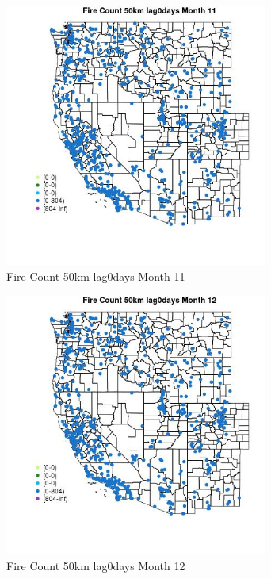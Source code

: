 \begin{figure} 
\centering  
\includegraphics[width=0.77\textwidth]{Code_Outputs/Report_ML_input_PM25_Step4_part_f_de_duplicated_aveswNAs_MapObsMo11Fire_Count_50km_lag0days.jpg} 
\caption{\label{fig:Report_ML_input_PM25_Step4_part_f_de_duplicated_aveswNAsMapObsMo11Fire_Count_50km_lag0days}Fire Count 50km lag0days Month 11} 
\end{figure} 
 

\begin{figure} 
\centering  
\includegraphics[width=0.77\textwidth]{Code_Outputs/Report_ML_input_PM25_Step4_part_f_de_duplicated_aveswNAs_MapObsMo12Fire_Count_50km_lag0days.jpg} 
\caption{\label{fig:Report_ML_input_PM25_Step4_part_f_de_duplicated_aveswNAsMapObsMo12Fire_Count_50km_lag0days}Fire Count 50km lag0days Month 12} 
\end{figure} 
 

